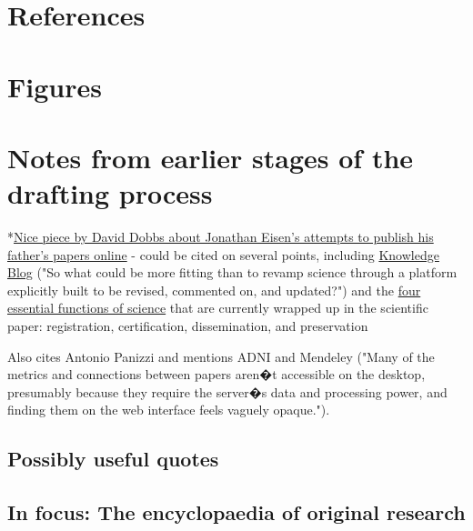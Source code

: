 \documentclass[final,authoryear,3p]{elsarticle-open-drafting}
\begin{document}
\section{References}

\section{Figures}

\section{Notes from earlier stages of the drafting process}



*\href{http://www.wired.com/wiredscience/2011/05/free-science-one-paper-at-a-time-2/all/1}{Nice piece by David Dobbs about Jonathan Eisen's attempts to publish his father's papers online} - could be cited on several points, including \href{http://knowledgeblog.org/}{Knowledge Blog} ("So what could be more fitting than to revamp science through a platform explicitly built to be revised, commented on, and updated?") and the \href{http://www.ariadne.ac.uk/issue7/fytton/}{four essential functions of science} that are currently wrapped up in the scientific paper: registration, certification, dissemination, and preservation

Also cites Antonio Panizzi and mentions ADNI and Mendeley ("Many of the metrics and connections between papers aren�t accessible on the desktop, presumably because they require the server�s data and processing power, and finding them on the web interface feels vaguely opaque.").

\subsection{Possibly useful quotes}


\subsection{In focus: The encyclopaedia of original research}
\end{document}
